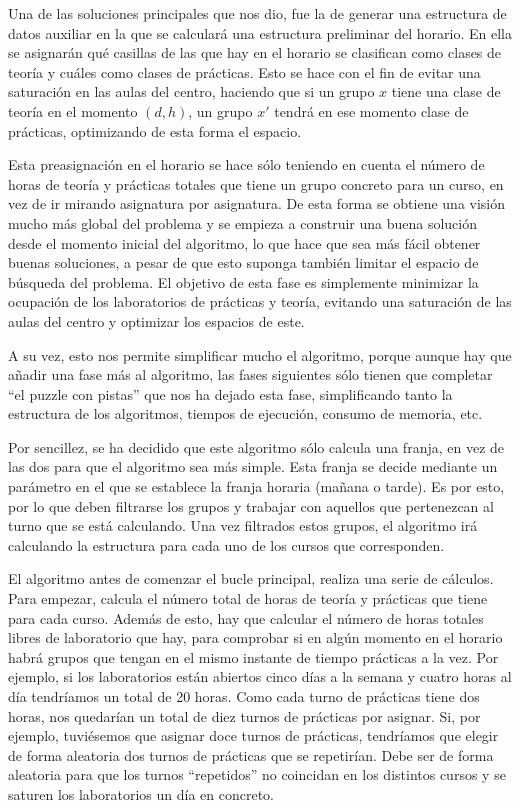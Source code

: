 Una de las soluciones principales que nos dio, fue la de generar una estructura de datos auxiliar en la que se calculará una estructura preliminar del horario. En ella se asignarán qué casillas de las que hay en el horario se clasifican como clases de teoría y cuáles como clases de prácticas. Esto se hace con el fin de evitar una saturación en las aulas del centro, haciendo que si un grupo $x$ tiene una clase de teoría en el momento $(d, h)$, un grupo $x'$ tendrá en ese momento clase de prácticas, optimizando de esta forma el espacio.

Esta preasignación en el horario se hace sólo teniendo en cuenta el número de horas de teoría y prácticas totales que tiene un grupo concreto para un curso, en vez de ir mirando asignatura por asignatura. De esta forma se obtiene una visión mucho más global del problema y se empieza a construir una buena solución desde el momento inicial del algoritmo, lo que hace que sea más fácil obtener buenas soluciones, a pesar de que esto suponga también limitar el espacio de búsqueda del problema. El objetivo de esta fase es simplemente minimizar la ocupación de los laboratorios de prácticas y teoría, evitando una saturación de las aulas del centro y optimizar los espacios de este.

A su vez, esto nos permite simplificar mucho el algoritmo, porque aunque hay que añadir una fase más al algoritmo, las fases siguientes sólo tienen que completar ``el puzzle con pistas'' que nos ha dejado esta fase, simplificando tanto la estructura de los algoritmos, tiempos de ejecución, consumo de memoria, etc.

Por sencillez, se ha decidido que este algoritmo sólo calcula una franja, en vez de las dos para que el algoritmo sea más simple. Esta franja se decide mediante un parámetro en el que se establece la franja horaria (mañana o tarde). Es por esto, por lo que deben filtrarse los grupos y trabajar con aquellos que pertenezcan al turno que se está calculando. Una vez filtrados estos grupos, el algoritmo irá calculando la estructura para cada uno de los cursos que corresponden.

El algoritmo antes de comenzar el bucle principal, realiza una serie de cálculos. Para empezar, calcula el número total de horas de teoría y prácticas que tiene para cada curso. Además de esto, hay que calcular el número de horas totales libres de laboratorio que hay, para comprobar si en algún momento en el horario habrá grupos que tengan en el mismo instante de tiempo prácticas a la vez. Por ejemplo, si los laboratorios están abiertos cinco días a la semana y cuatro horas al día tendríamos un total de 20 horas. Como cada turno de prácticas tiene dos horas, nos quedarían un total de diez turnos de prácticas por asignar. Si, por ejemplo, tuviésemos que asignar doce turnos de prácticas, tendríamos que elegir de forma aleatoria dos turnos de prácticas que se repetirían. Debe ser de forma aleatoria para que los turnos ``repetidos'' no coincidan en los distintos cursos y se saturen los laboratorios un día en concreto.

